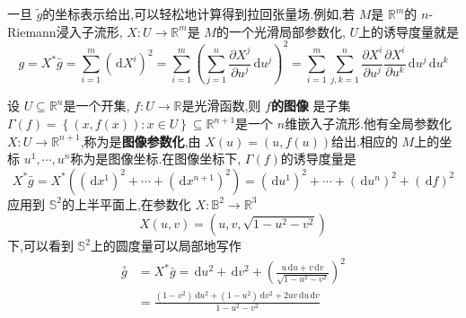 \documentclass[../../几何与拓扑.tex]{subfiles}
\begin{document}
一旦 \(  \tilde{g}  \)的坐标表示给出,可以轻松地计算得到拉回张量场.例如,若 \(  M  \)是 \(  \mathbb{R} ^{m}  \)的 \(  n  \)-Riemann浸入子流形, \(  X:U\to \mathbb{R} ^{m}  \)是 \(  M  \)的一个光滑局部参数化, \(  U  \)上的诱导度量就是 \[
g =  X^{*}\bar{g}=  \sum _{i= 1}^{m} \left( \,\mathrm{d} X^{i} \right)^{2} =  \sum _{i= 1}^{m} \left( \sum _{j= 1}^{n} \frac{\partial X^{j}}{\partial u^{j}}\,\mathrm{d} u^{j} \right)^{2} =  \sum _{i= 1}^{m} \sum _{j,k= 1}^{n} \frac{\partial X^{i}}{\partial u^{j}} \frac{\partial X^{i}}{\partial u^{k}} \,\mathrm{d} u^{j}\,\mathrm{d} u^{k} 
\]       


\begin{example} [图像坐标系上的诱导度量]
    设 \(  U\subseteq \mathbb{R} ^{n}  \)是一个开集, \(  f:U\to \mathbb{R}   \)是光滑函数,则 \textbf{\(  f  \)的图像 }是子集 \(   \Gamma \left( f \right)= \left\{ \left( x,f\left( x \right)  \right):x\in U  \right\}\subseteq \mathbb{R} ^{n+ 1}   \)是一个 \(  n  \)维嵌入子流形.他有全局参数化 \(  X:U\to \mathbb{R} ^{n+ 1}  \),称为是\textbf{图像参数化},由 \(  X\left( u \right)= \left( u,f\left( u \right)  \right)    \)给出.相应的 \(  M  \)上的坐标 \(   u^1,\cdots,u^n   \)称为是图像坐标.在图像坐标下, \(   \Gamma \left( f \right)   \)的诱导度量是 \[
        X^{*} \bar{g}= X^{*}\left( \left( \,\mathrm{d} x^{1} \right)^{2}+ \cdots + \left( \,\mathrm{d} x^{n+ 1} \right)^{2}   \right) =  \left( \,\mathrm{d} u^{1} \right)^{2}+ \cdots + \left( \,\mathrm{d} u^{n} \right)^{2}+ \left( \,\mathrm{d} f \right)^{2}   
        \]      应用到 \(  \mathbb{S}^{2}  \)的上半平面上,在参数化 \(  X:\mathbb{B}^{2}\to \mathbb{R} ^{3}  \) \[
        X\left( u,v \right)= \left( u,v,\sqrt{1-u^{2}-v^{2}} \right)  
        \]下,可以看到 \(  \mathbb{S}^{2}  \)上的圆度量可以局部地写作 \[
       \begin{aligned}
        \overset{\scriptstyle\circ}{g}&= X^{*}\bar{g}= \,\mathrm{d} u^{2}+ \,\mathrm{d} v^{2}+  \left( \frac{u\,\mathrm{d} u+ v\,\mathrm{d} v }{\sqrt{1-u^{2}-v^{2}} }  \right)^{2}\\ 
         &=  \frac{\left( 1-v^{2} \right)\,\mathrm{d} u^{2}+  \left( 1-u^{2} \right)\,\mathrm{d} v^{2}+ 2uv\,\mathrm{d} u\,\mathrm{d} v   }{1-u^{2}-v^{2} } 
       \end{aligned} 
        \]      
    
\end{example}

\hspace*{\fill} 
\end{document}
